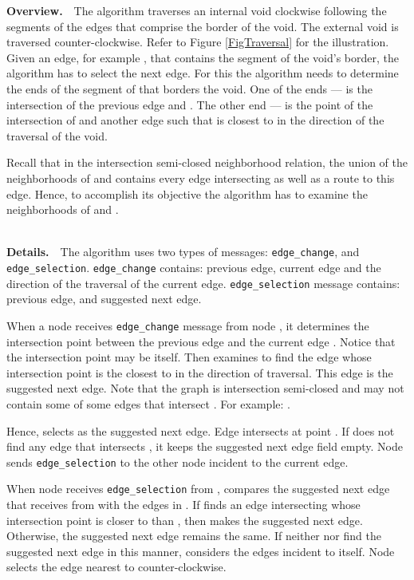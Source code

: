 \documentclass[conference]{IEEEtran}
\def\TT#1{\texttt{#1}}
\begin{document}
\noindent
\textbf{Overview.}\ \ The algorithm traverses an internal void
clockwise following the segments of the edges that comprise the border
of the void. The external void is traversed counter-clockwise.  Refer
to Figure \ref{FigTraversal} for the illustration. Given an edge, for
example , that contains the segment of the void's border, the
algorithm has to select the next edge. For this the algorithm needs to
determine the ends of the segment of  that borders the
void. One of the ends ---  is the intersection of the previous edge
 and . The other end ---  is the point of the
intersection of  and another edge  such that  is
closest to  in the direction of the traversal of the void.

Recall that in the intersection semi-closed neighborhood relation, the
union of the neighborhoods of  and  contains every edge
intersecting  as well as a route to this edge. Hence, to
accomplish its objective the algorithm has to examine the
neighborhoods of  and .

\ \\ \noindent
\textbf{Details.}\ \
The algorithm uses two types of messages: \TT{edge\_change}, and
\TT{edge\_selection}.  \TT{edge\_change} contains: previous edge,
current edge and the direction of the traversal of the current
edge. \TT{edge\_selection} message contains: previous edge, and
suggested next edge.

When a node  receives \TT{edge\_change} message from node , it
determines the intersection point  between the previous edge
 and the current edge . Notice that the intersection
point may be  itself.  Then  examines  to find the edge
whose intersection point is the closest to  in the direction of
traversal. This edge is the suggested next edge.  Note that the graph
is intersection semi-closed and  may not contain some of some
edges that intersect . For example: .

Hence,  selects  as the suggested next edge. Edge 
intersects  at point .  If  does not find any edge that
intersects , it keeps the suggested next edge field empty.
Node  sends \TT{edge\_selection} to the other node  incident to
the current edge.

When node  receives \TT{edge\_selection} from ,  compares the
suggested next edge  that  receives from  with the edges
in .  If  finds an edge  intersecting 
whose intersection point  is closer to  than , then  makes
 the suggested next edge. Otherwise, the suggested next edge
remains the same. If neither  nor  find the suggested next edge
in this manner,  considers the edges incident to itself. Node 
selects the edge nearest to  counter-clockwise.
\end{document}
